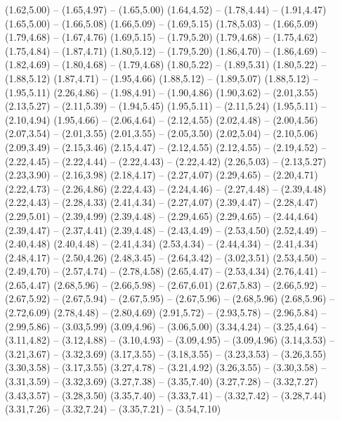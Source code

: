 \expandafter\def\csname geo:Strasse:neben\endcsname{
  (1.62,5.00) -- (1.65,4.97) -- (1.65,5.00)
  (1.64,4.52) -- (1.78,4.44) -- (1.91,4.47)
  (1.65,5.00) -- (1.66,5.08)
  (1.66,5.09) -- (1.69,5.15)
  (1.78,5.03) -- (1.66,5.09)
  (1.79,4.68) -- (1.67,4.76)
  (1.69,5.15) -- (1.79,5.20)
  (1.79,4.68) -- (1.75,4.62)
  (1.75,4.84) -- (1.87,4.71)
  (1.80,5.12) -- (1.79,5.20)
  (1.86,4.70) -- (1.86,4.69) -- (1.82,4.69) -- (1.80,4.68) -- (1.79,4.68)
  (1.80,5.22) -- (1.89,5.31)
  (1.80,5.22) -- (1.88,5.12)
  (1.87,4.71) -- (1.95,4.66)
  (1.88,5.12) -- (1.89,5.07)
  (1.88,5.12) -- (1.95,5.11)
  (2.26,4.86) -- (1.98,4.91) -- (1.90,4.86)
  (1.90,3.62) -- (2.01,3.55)
  (2.13,5.27) -- (2.11,5.39) -- (1.94,5.45)
  (1.95,5.11) -- (2.11,5.24)
  (1.95,5.11) -- (2.10,4.94)
  (1.95,4.66) -- (2.06,4.64) -- (2.12,4.55)
  (2.02,4.48) -- (2.00,4.56)
  (2.07,3.54) -- (2.01,3.55)
  (2.01,3.55) -- (2.05,3.50)
  (2.02,5.04) -- (2.10,5.06)
  (2.09,3.49) -- (2.15,3.46)
  (2.15,4.47) -- (2.12,4.55)
  (2.12,4.55) -- (2.19,4.52) -- (2.22,4.45) -- (2.22,4.44) -- (2.22,4.43) -- (2.22,4.42)
  (2.26,5.03) -- (2.13,5.27)
  (2.23,3.90) -- (2.16,3.98)
  (2.18,4.17) -- (2.27,4.07)
  (2.29,4.65) -- (2.20,4.71)
  (2.22,4.73) -- (2.26,4.86)
  (2.22,4.43) -- (2.24,4.46) -- (2.27,4.48) -- (2.39,4.48)
  (2.22,4.43) -- (2.28,4.33)
  (2.41,4.34) -- (2.27,4.07)
  (2.39,4.47) -- (2.28,4.47)
  (2.29,5.01) -- (2.39,4.99)
  (2.39,4.48) -- (2.29,4.65)
  (2.29,4.65) -- (2.44,4.64)
  (2.39,4.47) -- (2.37,4.41)
  (2.39,4.48) -- (2.43,4.49) -- (2.53,4.50)
  (2.52,4.49) -- (2.40,4.48)
  (2.40,4.48) -- (2.41,4.34)
  (2.53,4.34) -- (2.44,4.34) -- (2.41,4.34)
  (2.48,4.17) -- (2.50,4.26)
  (2.48,3.45) -- (2.64,3.42) -- (3.02,3.51)
  (2.53,4.50) -- (2.49,4.70) -- (2.57,4.74) -- (2.78,4.58)
  (2.65,4.47) -- (2.53,4.34)
  (2.76,4.41) -- (2.65,4.47)
  (2.68,5.96) -- (2.66,5.98) -- (2.67,6.01)
  (2.67,5.83) -- (2.66,5.92) -- (2.67,5.92) -- (2.67,5.94) -- (2.67,5.95) -- (2.67,5.96) -- (2.68,5.96)
  (2.68,5.96) -- (2.72,6.09)
  (2.78,4.48) -- (2.80,4.69)
  (2.91,5.72) -- (2.93,5.78) -- (2.96,5.84) -- (2.99,5.86) -- (3.03,5.99)
  (3.09,4.96) -- (3.06,5.00)
  (3.34,4.24) -- (3.25,4.64) -- (3.11,4.82) -- (3.12,4.88) -- (3.10,4.93) -- (3.09,4.95) -- (3.09,4.96)
  (3.14,3.53) -- (3.21,3.67) -- (3.32,3.69)
  (3.17,3.55) -- (3.18,3.55) -- (3.23,3.53) -- (3.26,3.55)
  (3.30,3.58) -- (3.17,3.55)
  (3.27,4.78) -- (3.21,4.92)
  (3.26,3.55) -- (3.30,3.58) -- (3.31,3.59) -- (3.32,3.69)
  (3.27,7.38) -- (3.35,7.40)
  (3.27,7.28) -- (3.32,7.27)
  (3.43,3.57) -- (3.28,3.50)
  (3.35,7.40) -- (3.33,7.41) -- (3.32,7.42) -- (3.28,7.44)
  (3.31,7.26) -- (3.32,7.24) -- (3.35,7.21) -- (3.54,7.10)
}
